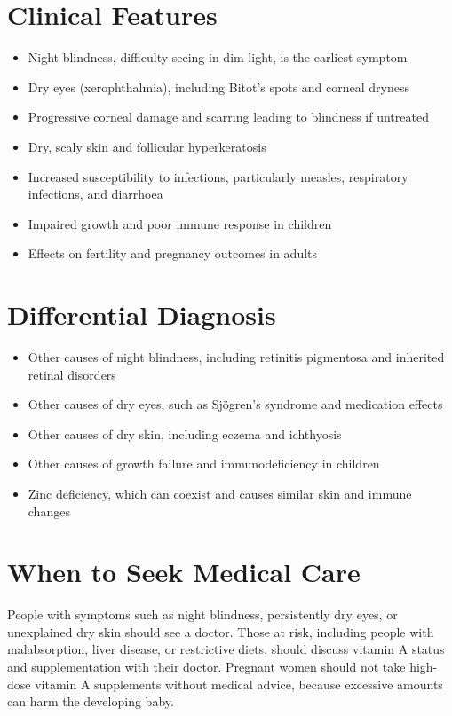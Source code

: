 \section*{Clinical Features}
\begin{itemize}
    \item Night blindness, difficulty seeing in dim light, is the earliest symptom
    \item Dry eyes (xerophthalmia), including Bitot's spots and corneal dryness
    \item Progressive corneal damage and scarring leading to blindness if untreated
    \item Dry, scaly skin and follicular hyperkeratosis
    \item Increased susceptibility to infections, particularly measles, respiratory infections, and diarrhoea
    \item Impaired growth and poor immune response in children
    \item Effects on fertility and pregnancy outcomes in adults
\end{itemize}

\section*{Differential Diagnosis}
\begin{itemize}
    \item Other causes of night blindness, including retinitis pigmentosa and inherited retinal disorders
    \item Other causes of dry eyes, such as Sjögren's syndrome and medication effects
    \item Other causes of dry skin, including eczema and ichthyosis
    \item Other causes of growth failure and immunodeficiency in children
    \item Zinc deficiency, which can coexist and causes similar skin and immune changes
\end{itemize}

\section*{When to Seek Medical Care}
People with symptoms such as night blindness, persistently dry eyes, or unexplained dry skin should see a doctor. Those at risk, including people with malabsorption, liver disease, or restrictive diets, should discuss vitamin A status and supplementation with their doctor. Pregnant women should not take high-dose vitamin A supplements without medical advice, because excessive amounts can harm the developing baby.


